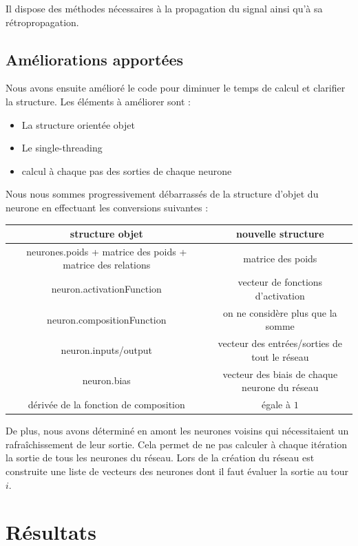\medskip

Il dispose des méthodes nécessaires à la propagation du signal ainsi qu'à
sa rétropropagation.

\subsection{Améliorations apportées}

Nous avons ensuite amélioré le code pour diminuer le temps de calcul et clarifier
la structure. Les éléments à améliorer sont :
\begin{itemize}
  \item La structure orientée objet
  \item Le single-threading
  \item calcul à chaque pas des sorties de chaque neurone
\end{itemize}

\medskip

Nous nous sommes progressivement débarrassés de la structure d'objet du neurone
en effectuant les conversions suivantes :

\medskip

\begin{tabular}{c|c}
   structure objet & nouvelle structure \\
   \hline
   neurones.poids + matrice des poids + matrice des relations & matrice des poids \\
   neuron.activationFunction & vecteur de fonctions d'activation \\
   neuron.compositionFunction & on ne considère plus que la somme \\
   neuron.inputs/output & vecteur des entrées/sorties de tout le réseau \\
   neuron.bias & vecteur des biais de chaque neurone du réseau \\
   dérivée de la fonction de composition & égale à $1$
\end{tabular}

\medskip

De plus, nous avons déterminé en amont les neurones voisins qui nécessitaient
un rafraîchissement de leur sortie. Cela permet de ne pas calculer à chaque
itération la sortie de tous les neurones du réseau. Lors de la création du
réseau est construite une liste de vecteurs des neurones dont il faut évaluer
la sortie au tour $i$.

\section{Résultats}

